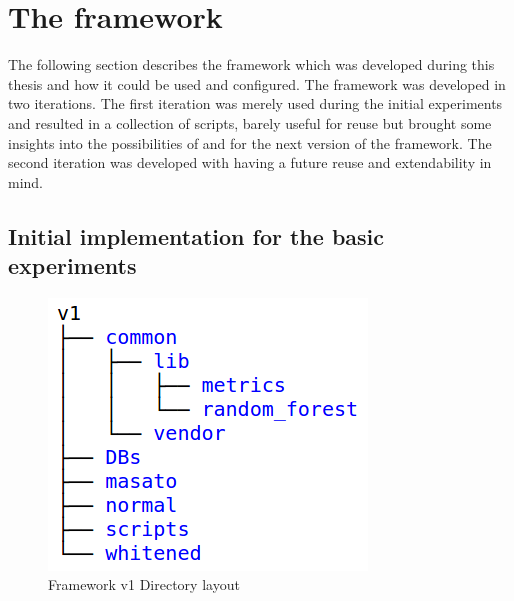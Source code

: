 
\section{The framework}
\label{sec:framework}

The following section describes the framework which was developed during this thesis and how it could be used and configured. The framework was developed in two iterations. The first iteration was merely used during the initial experiments and resulted in a collection of \MATLAB scripts, barely useful for reuse but brought some insights into the possibilities of \MATLAB and for the next version of the framework. The second iteration was developed with having a future reuse and extendability in mind.

\subsection{Initial implementation for the basic experiments}

\begin{figure}
\includegraphics[width=\textwidth]{content/pictures/v1_dirs.png}
\caption{Framework v1 Directory layout}
\label{fig:framework_v1_dirs}
\end{figure}

